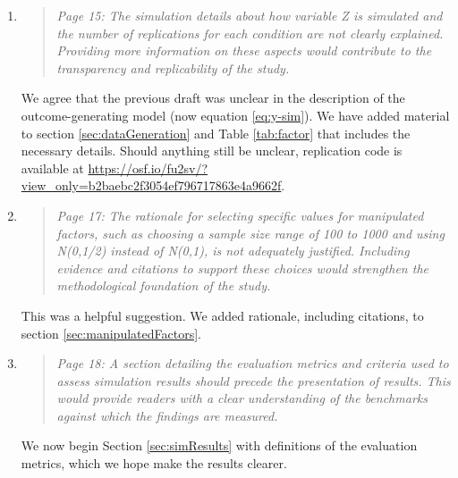 \documentclass[]{article}
\newenvironment{itquote}
  {\begin{quote} \itshape}
  {\end{quote}\ignorespacesafterend}
\begin{document}
\begin{enumerate}
\item \begin{itquote}
     Page 15: The simulation details about how variable Z is simulated and the number of replications for each condition are not clearly explained. Providing more information on these aspects would contribute to the transparency and replicability of the study.
\end{itquote}
We agree that the previous draft was unclear in the description of the outcome-generating model (now equation \ref{eq:y-sim}). We have added material to section \ref{sec:dataGeneration} and Table \ref{tab:factor} that includes the necessary details. Should anything still be unclear, replication code is available at \url{https://osf.io/fu2sv/?view_only=b2baebc2f3054ef796717863e4a9662f}.


\item \begin{itquote}     Page 17: The rationale for selecting specific values for manipulated factors, such as choosing a sample size range of 100 to 1000 and using N(0,1/2) instead of N(0,1), is not adequately justified. Including evidence and citations to support these choices would strengthen the methodological foundation of the study.

\end{itquote}
This was a helpful suggestion. We added rationale, including citations, to section \ref{sec:manipulatedFactors}.

\item \begin{itquote}     Page 18: A section detailing the evaluation metrics and criteria used to assess simulation results should precede the presentation of results. This would provide readers with a clear understanding of the benchmarks against which the findings are measured.

\end{itquote}
We now begin Section \ref{sec:simResults} with definitions of the evaluation metrics, which we hope make the results clearer.


\end{enumerate}
\end{document}
